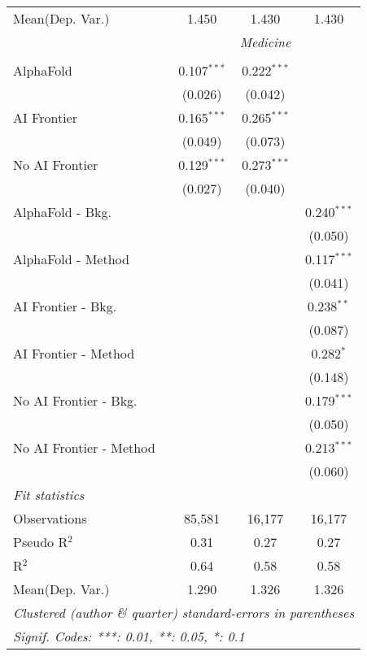 \begin{tabular}{lccc}
Mean(Dep. Var.) & 1.450 & 1.430 & 1.430 \\
 & \multicolumn{3}{c}{\textit{Medicine}} \\ \\
   AlphaFold               & 0.107$^{***}$ & 0.222$^{***}$ &   \\   
                           & (0.026)       & (0.042)       &   \\   
   AI Frontier             & 0.165$^{***}$ & 0.265$^{***}$ &   \\   
                           & (0.049)       & (0.073)       &   \\   
   No AI Frontier          & 0.129$^{***}$ & 0.273$^{***}$ &   \\   
                           & (0.027)       & (0.040)       &   \\   
   AlphaFold - Bkg.        &               &               & 0.240$^{***}$\\   
                           &               &               & (0.050)\\   
   AlphaFold - Method      &               &               & 0.117$^{***}$\\   
                           &               &               & (0.041)\\   
   AI Frontier - Bkg.      &               &               & 0.238$^{**}$\\   
                           &               &               & (0.087)\\   
   AI Frontier - Method    &               &               & 0.282$^{*}$\\   
                           &               &               & (0.148)\\   
   No AI Frontier - Bkg.   &               &               & 0.179$^{***}$\\   
                           &               &               & (0.050)\\   
   No AI Frontier - Method &               &               & 0.213$^{***}$\\   
                           &               &               & (0.060)\\   
   \midrule
   \emph{Fit statistics}\\
   Observations            & 85,581        & 16,177        & 16,177\\  
   Pseudo R$^2$            & 0.31          & 0.27          & 0.27\\  
   R$^2$                   & 0.64          & 0.58          & 0.58\\  
Mean(Dep. Var.) & 1.290 & 1.326 & 1.326 \\
   \midrule \midrule
   \multicolumn{4}{l}{\emph{Clustered (author \& quarter) standard-errors in parentheses}}\\
   \multicolumn{4}{l}{\emph{Signif. Codes: ***: 0.01, **: 0.05, *: 0.1}}\\
\end{tabular}
\par\endgroup

